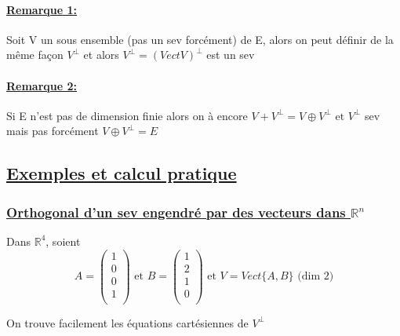 \documentclass{article}
\begin{document}
\paragraph{\underline{Remarque 1:}} Soit V un sous ensemble (pas un sev forcément) de E, alors on peut définir de la même façon $V^\perp$ et alors $V^\perp = (Vect V)^\perp$ est un sev

\paragraph{\underline{Remarque 2:}} Si E n'est pas de dimension finie alors on à encore $V + V^\perp = V \oplus V^\perp \mbox{ et } V^\perp$ sev mais pas forcément $V \oplus V^\perp = E$

\subsection{\underline{Exemples et calcul pratique}}

\subsubsection{\underline{Orthogonal d'un sev engendré par des vecteurs dans $\mathbb{R}^n$}}

Dans $\mathbb{R}^4$, soient
$$A = \begin{pmatrix}
    1\\
    0\\
    0\\
    1\\
\end{pmatrix} \mbox{ et } B = \begin{pmatrix}
    1\\
    2\\
    1\\
    0\\
\end{pmatrix} \mbox{ et } V = Vect\{A, B\} \mbox{ (dim 2)}$$

On trouve facilement les équations cartésiennes de $V^\perp$
\end{document}
